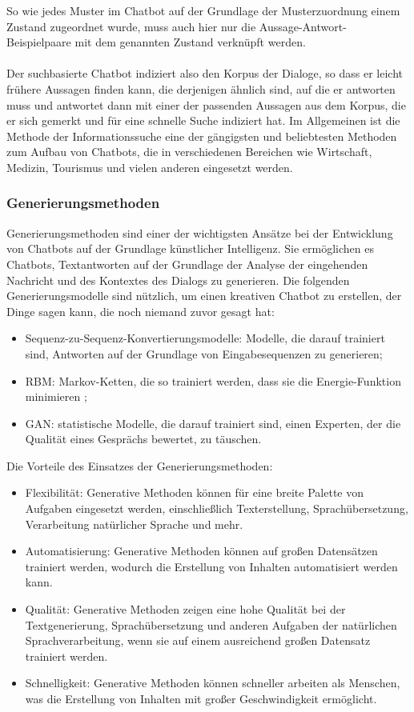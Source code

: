 So wie jedes Muster im Chatbot auf der Grundlage der Musterzuordnung einem Zustand zugeordnet wurde, muss auch hier nur die Aussage-Antwort-Beispielpaare mit dem genannten Zustand verknüpft werden.\\\\
Der suchbasierte Chatbot indiziert also den Korpus der Dialoge, so dass er leicht frühere Aussagen finden kann, die derjenigen ähnlich sind, auf die er antworten muss und antwortet dann mit einer der passenden Aussagen aus dem Korpus, die er sich \glqq{}gemerkt\grqq{} und für eine schnelle Suche indiziert hat. 
Im Allgemeinen ist die Methode der Informationssuche eine der gängigsten und beliebtesten Methoden zum Aufbau von Chatbots, die in verschiedenen Bereichen wie Wirtschaft, Medizin, Tourismus und vielen anderen eingesetzt werden.
\subsubsection{Generierungsmethoden}
Generierungsmethoden sind einer der wichtigsten Ansätze bei der Entwicklung von Chatbots auf der Grundlage künstlicher Intelligenz. 
Sie ermöglichen es Chatbots, Textantworten auf der Grundlage der Analyse der eingehenden Nachricht und des Kontextes des Dialogs zu generieren. 
Die folgenden Generierungsmodelle sind nützlich, um einen kreativen Chatbot zu erstellen, der Dinge sagen kann, die noch niemand zuvor gesagt hat:
\begin{itemize}
    \item Sequenz-zu-Sequenz-Konvertierungsmodelle: Modelle, die darauf trainiert sind, Antworten auf der Grundlage von Eingabesequenzen zu generieren;
    \item \ac{RBM}: Markov-Ketten, die so trainiert werden, dass sie die \glqq{}Energie\grqq{}-Funktion minimieren \cite{chatbot_development_sharma};
    \item \ac{GAN}: statistische Modelle, die darauf trainiert sind, einen Experten, der die Qualität eines Gesprächs bewertet, zu täuschen. \cite{li_adversarial_2017}
\end{itemize}
Die Vorteile des Einsatzes der Generierungsmethoden:
\begin{itemize}
    \item Flexibilität: Generative Methoden können für eine breite Palette von Aufgaben eingesetzt werden, einschließlich Texterstellung, Sprachübersetzung, Verarbeitung natürlicher Sprache und mehr.
    \item Automatisierung: Generative Methoden können auf großen Datensätzen trainiert werden, wodurch die Erstellung von Inhalten automatisiert werden kann.
    \item Qualität: Generative Methoden zeigen eine hohe Qualität bei der Textgenerierung, Sprachübersetzung und anderen Aufgaben der natürlichen Sprachverarbeitung, wenn sie auf einem ausreichend großen Datensatz trainiert werden.
    \item Schnelligkeit: Generative Methoden können schneller arbeiten als Menschen, was die Erstellung von Inhalten mit großer Geschwindigkeit ermöglicht.
\end{itemize}
